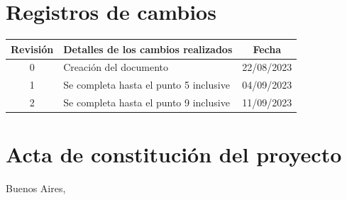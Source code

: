 \documentclass[
11pt, %
]{charter}
\begin{document}
\maketitle
\thispagestyle{empty}
\pagebreak


\thispagestyle{empty}
{\setlength{\parskip}{0pt}
\tableofcontents{}
}
\pagebreak


\section*{Registros de cambios}
\label{sec:registro}


\begin{table}[ht]
\label{tab:registro}
\centering
\begin{tabularx}{\linewidth}{@{}|c|X|c|@{}}
\hline
\rowcolor[HTML]{C0C0C0} 
Revisión & \multicolumn{1}{c|}{\cellcolor[HTML]{C0C0C0}Detalles de los cambios realizados} & Fecha      \\ \hline
0      & Creación del documento                                 & 22/08/2023 \\ \hline
1      & Se completa hasta el punto 5 inclusive                 & 04/09/2023 \\ \hline
2      & Se completa hasta el punto 9 inclusive					& 11/09/2023 \\ \hline
\end{tabularx}
\end{table}

\pagebreak



\section*{Acta de constitución del proyecto}
\label{sec:acta}

\begin{flushright}
Buenos Aires, \fechaInicioName
\end{flushright}

\vspace{2cm}
\end{document}
